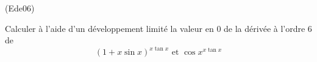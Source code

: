 \begin{tiny}(Ede06)\end{tiny}
Calculer à l'aide d'un d{\'e}veloppement limit{\'e} la valeur en $0$ de la d{\'e}riv{\'e}e {\`a} l'ordre 6 de
\[
(1 + x\sin x)^{x\tan x}\text{ et } \cos x^{x \tan x}
\]